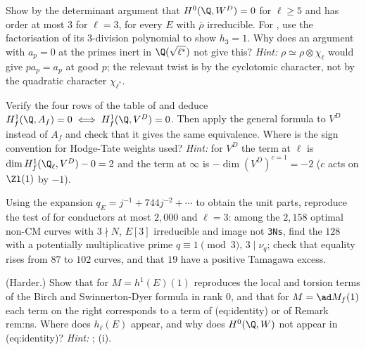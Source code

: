 \begin{exercise}[$h_\ell(E)$]\label{ex:blochkato:ex-h0}
Show by the determinant argument that $H^0(\Q,W^D)=0$ for $\ell\ge5$ and has order at most $3$ for $\ell=3$, for every $E$ with $\bar\rho$ irreducible. For , use the factorisation
of its $3$-division polynomial to show $h_3=1$. Why does an argument with $a_p=0$ at the primes inert in $\Q(\sqrt{\ell^*})$ not give this?
\emph{Hint:} $\rho\simeq\rho\otimes\chi_\ell$ would give $pa_p=a_p$ at good $p$; the relevant twist is by the cyclotomic character, not by the quadratic character $\chi_{\ell^*}$.
\end{exercise}

\begin{exercise}\label{ex:blochkato:ex-euler}
Verify the four rows of the table of  and deduce $H^1_f(\Q,A_f)=0\iff H^1_f(\Q,V^D)=0$. Then apply the general formula to $V^D$ instead of $A_f$
and check that it gives the same equivalence. Where is the sign convention for Hodge-Tate weights used?
\emph{Hint:} for $V^D$ the term at $\ell$ is $\dim H^1_f(\Q_\ell,V^D)-0=2$ and the term at $\infty$ is $-\dim(V^D)^{c=1}=-2$ ($c$ acts on $\Zl(1)$ by $-1$).
\end{exercise}

\begin{exercise}\label{ex:blochkato:ex-small-range}
Using the expansion $q_E=j^{-1}+744j^{-2}+\cdots$ to obtain the unit parts, reproduce the test of  for conductors at most $2{,}000$ and $\ell=3$: among the
$2{,}158$ optimal non-CM curves with $3\nmid N$, $E[3]$ irreducible and image not \texttt{3Ns}, find the $128$ with a potentially multiplicative prime $q\equiv1\pmod3$, $3\mid\nu_q$; check that
equality rises from $87$ to $102$ curves, and that $19$ have a positive Tamagawa excess.
\end{exercise}

\begin{exercise}\label{ex:blochkato:ex-bsd}
(Harder.) Show that  for $M=h^1(E)(1)$ reproduces the local and torsion terms of the Birch and Swinnerton-Dyer formula in rank $0$, and that for $M=\ad M_f(1)$
each term on the right corresponds to a term of (eq:identity) or of Remark rem:ns. Where does $h_\ell(E)$ appear, and why does $H^0(\Q,W)$ not appear in (eq:identity)?
\emph{Hint:} ; (i).
\end{exercise}

